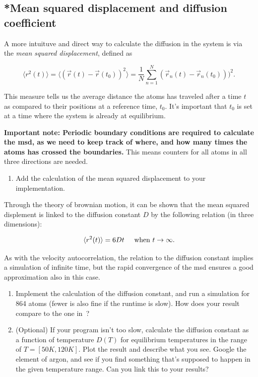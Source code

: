 \documentclass[11pt,british,a4paper]{report}
\begin{document}
\subsection{*Mean squared displacement and diffusion coefficient}
A more intuituve and direct way to calculate the diffusion in the system is via the \textit{mean squared displacement}, defined as

\begin{equation}
 \langle r^2(t) \rangle = \langle (\vec{r}(t) - \vec{r}(t_0))^2 \rangle = \frac{1}{N} \sum_{n=1}^N (\vec{r}_n(t) - \vec{r}_n(t_0)))^2.
 \label{eq:msd}
\end{equation}

This measure tells us the average distance the atoms has traveled after a time $t$ as compared to their positions at a reference time, $t_0$. It's important that $t_0$ is set at a time where the system is already at equilibrium.

\textbf{Important note: Periodic boundary conditions are required to calculate the msd, as we need to keep track of where, and how many times the atoms has crossed the boundaries.} This means counters for all atoms in all three directions are needed.

\begin{enumerate}[label=\roman*.]
    \item Add the calculation of the mean squared displacement to your implementation.
\end{enumerate}

Through the theory of brownian motion, it can be shown that the mean squared displement is linked to the diffusion constant $D$ by the following relation (in three dimensions):

\begin{equation}
 \langle r^2(t) \rangle = 6Dt \hspace{0.5 cm} \text{when } t \rightarrow \infty.
\end{equation}

As with the velocity autocorrelation, the relation to the diffusion constant implies a simulation of infinite time, but the rapid convergence of the msd ensures a good approximation also in this case.  

\begin{enumerate}[label=\roman*., resume]
    \item Implement the calculation of the diffusion constant, and run a simulation for 864 atoms (fewer is also fine if the runtime is slow). How does your result compare to the one in~\cite{Rahman_1964}?
    \item (Optional) If your program isn't too slow, calculate the diffusion constant as a function of temperature \(D(T)\) for equilibrium temperatures in the range of \(T = [50 K, 120K]\). Plot the result and describe what you see. Google the element of argon, and see if you find something that's supposed to happen in the given temperature range. Can you link this to your results?   
\end{enumerate}
\end{document}
